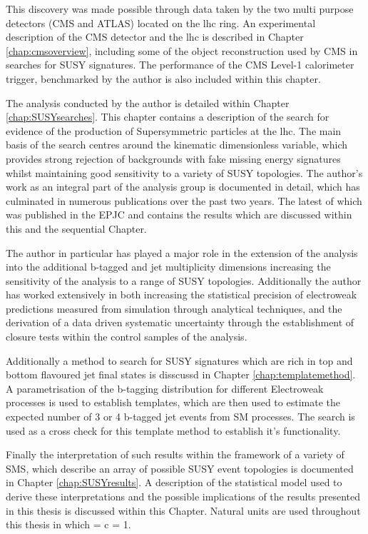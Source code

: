 This discovery was made possible through data taken by the two multi purpose detectors (\ac{CMS} and \ac{ATLAS}) located on the \ac{lhc} ring. An experimental description of the \ac{CMS} detector and the \ac{lhc} is described in Chapter \ref{chap:cmsoverview}, including some of the object reconstruction used by \ac{CMS} in searches for \ac{SUSY} signatures. The performance of the \ac{CMS} Level-1 calorimeter trigger, benchmarked by the author is also included within this chapter.

The analysis conducted by the author is detailed within Chapter \ref{chap:SUSYsearches}. This chapter contains a description of the search for evidence of the production of Supersymmetric particles at the \ac{lhc}. The main basis of the search centres around the kinematic dimensionless \alphat variable, which provides strong rejection of backgrounds with fake missing energy signatures whilst maintaining good sensitivity to a variety of \ac{SUSY} topologies. The author's work as an integral part of the analysis group is documented in detail, which has culminated in numerous publications over the past two years. The latest of which was published in the \acf{EPJC} \cite{ra1_epjc} and contains the results which are discussed within this and the sequential Chapter. 

The author in particular has played a major role in the extension of the \alphat analysis into the additional b-tagged and jet multiplicity dimensions increasing the sensitivity of the analysis to a range of \ac{SUSY} topologies. Additionally the author has worked extensively in both increasing the statistical precision of electroweak predictions measured from simulation through analytical techniques, and the derivation of a data driven systematic uncertainty through the establishment of closure tests within the control samples of the analysis. 

Additionally a method to search for \ac{SUSY} signatures which are rich in top and bottom flavoured jet final states is disscussd in Chapter \ref{chap:templatemethod}. A parametrisation of the b-tagging distribution for different Electroweak processes is used to establish templates, which are then used to estimate the expected number of 3 or 4 b-tagged jet events from \ac{SM} processes. The \alphat search is used as a cross check for this template method to establish it's functionality. 

Finally the interpretation of such results within the framework of a variety of \acf{SMS}, which describe an array of possible \ac{SUSY} event topologies is documented in Chapter \ref{chap:SUSYresults}. A description of the statistical model used to derive these interpretations and the possible implications of the results presented in this thesis is discussed within this Chapter. Natural units are used throughout this thesis in which \hbarred = c = 1.
